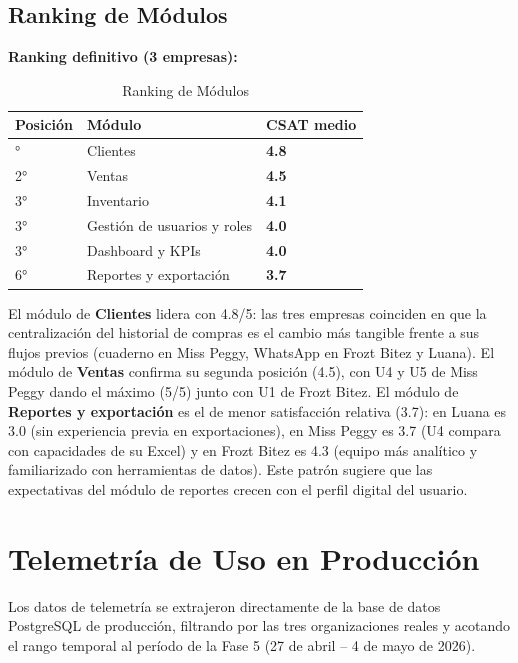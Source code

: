 \subsection{Ranking de Módulos}\label{ranking-de-muxf3dulos}

\textbf{Ranking definitivo (3 empresas):}

\begin{longtable}[]{@{}lll@{}}
\caption[Ranking de Módulos]{Ranking de Módulos}\tabularnewline
\toprule\noalign{}
Posición & Módulo & CSAT medio \\
\midrule\noalign{}
\endhead
\bottomrule\noalign{}
\endlastfoot
1° & Clientes & \textbf{4.8} \\
2° & Ventas & \textbf{4.5} \\
3° & Inventario & \textbf{4.1} \\
3° & Gestión de usuarios y roles & \textbf{4.0} \\
3° & Dashboard y KPIs & \textbf{4.0} \\
6° & Reportes y exportación & \textbf{3.7} \\
\end{longtable}

El módulo de \textbf{Clientes} lidera con 4.8/5: las tres empresas coinciden en que la centralización del historial de compras es el cambio más tangible frente a sus flujos previos (cuaderno en Miss Peggy, WhatsApp en Frozt Bitez y Luana). El módulo de \textbf{Ventas} confirma su segunda posición (4.5), con U4 y U5 de Miss Peggy dando el máximo (5/5) junto con U1 de Frozt Bitez. El módulo de \textbf{Reportes y exportación} es el de menor satisfacción relativa (3.7): en Luana es 3.0 (sin experiencia previa en exportaciones), en Miss Peggy es 3.7 (U4 compara con capacidades de su Excel) y en Frozt Bitez es 4.3 (equipo más analítico y familiarizado con herramientas de datos). Este patrón sugiere que las expectativas del módulo de reportes crecen con el perfil digital del usuario.

\section{Telemetría de Uso en Producción}\label{telemetruxeda-de-uso-en-producciuxf3n}

Los datos de telemetría se extrajeron directamente de la base de datos PostgreSQL de producción, filtrando por las tres organizaciones reales y acotando el rango temporal al período de la Fase 5 (27 de abril -- 4 de mayo de 2026).


